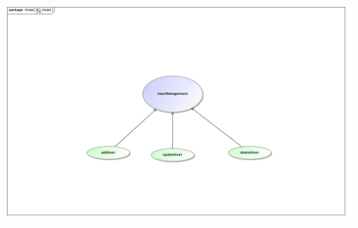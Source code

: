 \documentclass[english]{article}
\begin{document}
		\includegraphics[width=14cm,height=14cm,keepaspectratio]{userManagement.jpg}
\end{document}
